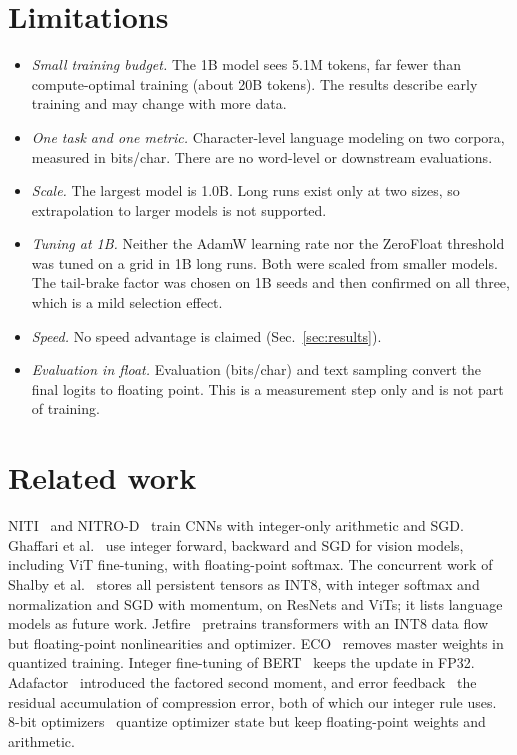 \documentclass[11pt]{article}
\begin{document}
\section{Limitations}
\begin{itemize}
\item \emph{Small training budget.} The 1B model sees 5.1M tokens, far fewer than compute-optimal training (about 20B tokens). The results describe early training and may change with more data.
\item \emph{One task and one metric.} Character-level language modeling on two corpora, measured in bits/char. There are no word-level or downstream evaluations.
\item \emph{Scale.} The largest model is 1.0B. Long runs exist only at two sizes, so extrapolation to larger models is not supported.
\item \emph{Tuning at 1B.} Neither the AdamW learning rate nor the ZeroFloat threshold was tuned on a grid in 1B long runs. Both were scaled from smaller models. The tail-brake factor was chosen on 1B seeds and then confirmed on all three, which is a mild selection effect.
\item \emph{Speed.} No speed advantage is claimed (Sec.~\ref{sec:results}).
\item \emph{Evaluation in float.} Evaluation (bits/char) and text sampling convert the final logits to floating point. This is a measurement step only and is not part of training.
\end{itemize}

\section{Related work}
NITI~\cite{niti} and NITRO-D~\cite{nitrod} train CNNs with integer-only arithmetic and SGD. Ghaffari et al.~\cite{ghaffari} use integer forward, backward and SGD for vision models, including ViT fine-tuning, with floating-point softmax. The concurrent work of Shalby et al.~\cite{shalby} stores all persistent tensors as INT8, with integer softmax and normalization and SGD with momentum, on ResNets and ViTs; it lists language models as future work. Jetfire~\cite{jetfire} pretrains transformers with an INT8 data flow but floating-point nonlinearities and optimizer. ECO~\cite{eco} removes master weights in quantized training. Integer fine-tuning of BERT~\cite{bertint} keeps the update in FP32. Adafactor~\cite{adafactor} introduced the factored second moment, and error feedback~\cite{ef} the residual accumulation of compression error, both of which our integer rule uses. 8-bit optimizers~\cite{opt8} quantize optimizer state but keep floating-point weights and arithmetic.
\end{document}
